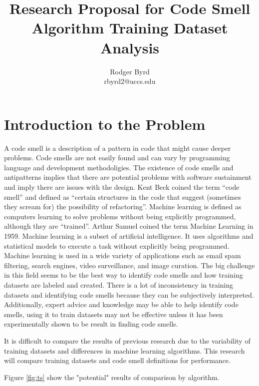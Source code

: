 \documentclass[conference]{IEEEtran}
\begin{document}

\title{Research Proposal for Code Smell Algorithm Training Dataset Analysis}
\author{Rodger Byrd\\rbyrd2@uccs.edu}
\maketitle

\section{Introduction to the Problem}
A code smell is a description of a pattern in code that might cause deeper problems. 
Code smells are not easily found and can vary by programming language and development methodoligies.
The existence of code smells and antipatterns implies that there are potential problems with software sustainment and imply there are issues with the design.
Kent Beck coined the term ``code smell'' \cite{fowler_refactoring:_2018} and defined as ``certain structures in the code that suggest (sometimes they scream for) the possibility of refactoring''.
Machine learning is defined as computers learning to solve problems without being explicitly programmed, although they are ``trained''\cite{bishop_pattern_2006}. 
Arthur Samuel coined the term Machine Learning in 1959\cite{samuel_studies_1988}.
Machine learning is a subset of artificial intelligence. 
It uses algorithms and statistical models to execute a task without explicitly being programmed.
Machine learning is used in a wide variety of applications such as email spam filtering, search engines, video surveillance, and image curation.
The big challenge in this field seems to be the best way to identify code smells and how training datasets are labeled and created.
There is a lot of inconsistency in training datasets and identifying code smells because they can be subjectively interpreted.
Additionally, expert advice and knowledge may be able to help identify code smells, using it to train datasets may not be effective unless it has been experimentally shown to be result in finding code smells. 

It is difficult to compare the results of previous research due to the variability of training datasets and differences in machine learning algorithms.
This research will compare training datasets and code smell definitions for performance.

Figure \ref{fig:ts} show the "potential" results of comparison by algorithm. 
\end{document}
